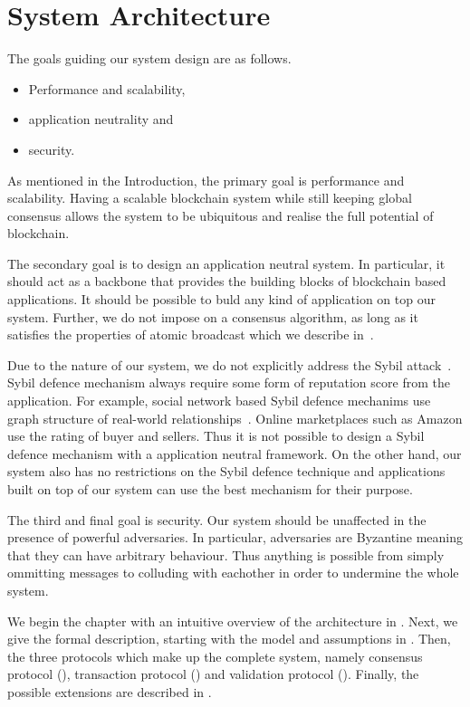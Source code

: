 \chapter{System Architecture}
\label{ch:model}

The goals guiding our system design are as follows.
\begin{itemize}
    \item Performance and scalability,
    \item application neutrality and
    \item security.
\end{itemize}

As mentioned in the Introduction, the primary goal is performance and scalability.
Having a scalable blockchain system while still keeping global consensus
allows the system to be ubiquitous and realise the full potential of blockchain.

The secondary goal is to design an application neutral system.
In particular, it should act as a backbone that provides the building blocks of blockchain based applications.
It should be possible to buld any kind of application on top our system.
Further, we do not impose on a consensus algorithm, as long as it satisfies the properties of atomic broadcast which we describe in~.

Due to the nature of our system, we do not explicitly address the Sybil attack~\cite{douceur2002sybil}.
Sybil defence mechanism always require some form of reputation score from the application.
For example, social network based Sybil defence mechanims use graph structure of real-world relationships~\cite{yu2006sybilguard}.
Online marketplaces such as Amazon use the rating of buyer and sellers.
Thus it is not possible to design a Sybil defence mechanism with a application neutral framework.
On the other hand, our system also has no restrictions on the Sybil defence technique
and applications built on top of our system can use the best mechanism for their purpose.

The third and final goal is security.
Our system should be unaffected in the presence of powerful adversaries.
In particular, adversaries are Byzantine meaning that they can have arbitrary behaviour.
Thus anything is possible from simply ommitting messages to colluding with eachother in order to undermine the whole system.

We begin the chapter with an intuitive overview of the architecture in .
Next, we give the formal description, starting with the model and assumptions in .
Then, the three protocols which make up the complete system,
namely consensus protocol (), transaction protocol () and validation protocol ().
Finally, the possible extensions are described in .


